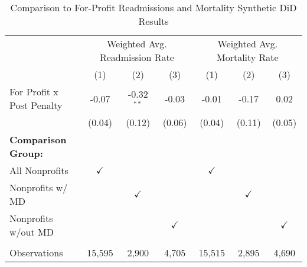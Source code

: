 \begin{table}[ht!]

\caption{\label{tab:forprofit_synth} Comparison to For-Profit Readmissions and Mortality Synthetic DiD Results}
\centering
\begin{tabular}[t]{lcccccc}
\toprule
\multicolumn{1}{c}{ } & \multicolumn{3}{c}{Weighted Avg. Readmission Rate} & \multicolumn{3}{c}{Weighted Avg. Mortality Rate} \\
 & (1) & (2) & (3) & (1) & (2) & (3)\\
\midrule
For Profit x Post Penalty & -0.07 & -0.32$^{**}$ & -0.03 & -0.01 & -0.17 & 0.02\\
 & (0.04) & (0.12) & (0.06) & (0.04) & (0.11) & (0.05)\\
\textbf{Comparison Group:} &  &  &  &  &  & \\
All Nonprofits & $\checkmark$ &  &  & $\checkmark$ &  & \\
Nonprofits w/ MD &  & $\checkmark$ &  &  & $\checkmark$ & \\
Nonprofits w/out MD &  &  & $\checkmark$ &  &  & $\checkmark$\\
\\
Observations & 15,595 & 2,900 & 4,705 & 15,515 & 2,895 & 4,690\\
\bottomrule
\end{tabular}
\end{table}